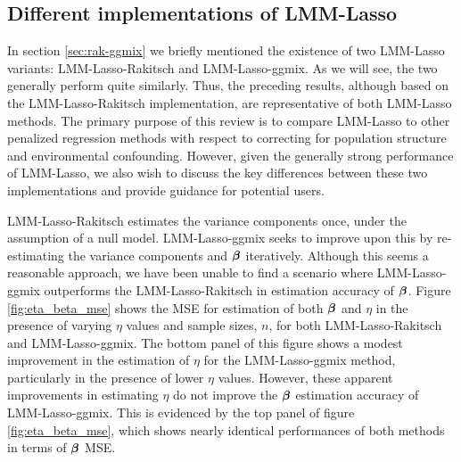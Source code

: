 \subsection{Different implementations of LMM-Lasso}

In section \ref{sec:rak-ggmix} we briefly mentioned the existence of two LMM-Lasso variants: LMM-Lasso-Rakitsch and LMM-Lasso-ggmix. As we will see, the two generally perform quite similarly. Thus, the preceding results, although based on the LMM-Lasso-Rakitsch implementation, are representative of both LMM-Lasso methods. The primary purpose of this review is to compare LMM-Lasso to other penalized regression methods with respect to correcting for population structure and environmental confounding. However, given the generally strong performance of LMM-Lasso, we also wish to discuss the key differences between these two implementations and provide guidance for potential users.

LMM-Lasso-Rakitsch estimates the variance components once, under the assumption of a null model. LMM-Lasso-ggmix seeks to improve upon this by re-estimating the variance components and $\boldsymbol{\beta}$ iteratively. Although this seems a reasonable approach, we have been unable to find a scenario where LMM-Lasso-ggmix outperforms the LMM-Lasso-Rakitsch in estimation accuracy of $\boldsymbol{\beta}$. Figure \ref{fig:eta_beta_mse} shows the MSE for estimation of both $\boldsymbol{\beta}$ and $\eta$ in the presence of varying $\eta$ values and sample sizes, $n$, for both LMM-Lasso-Rakitsch and LMM-Lasso-ggmix. The bottom panel of this figure shows a modest improvement in the estimation of $\eta$ for the LMM-Lasso-ggmix method, particularly in the presence of lower $\eta$ values. However, these apparent improvements in estimating $\eta$ do not improve the $\boldsymbol{\beta}$ estimation accuracy of LMM-Lasso-ggmix. This is evidenced by the top panel of figure \ref{fig:eta_beta_mse}, which shows nearly identical performances of both methods in terms of $\boldsymbol{\beta}$ MSE. 

